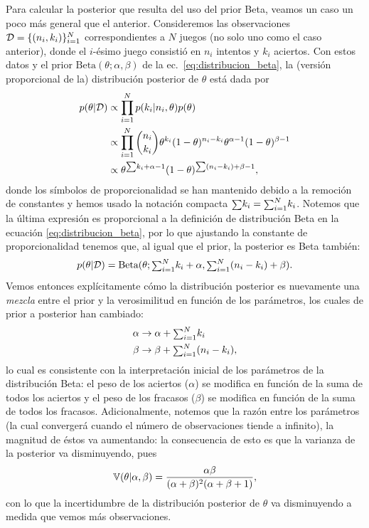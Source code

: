 Para calcular la posterior que resulta del uso del prior Beta, veamos un caso un poco más general que el anterior. Consideremos las observaciones ${\mathcal D} = \{(n_i,k_i)\}_{i=1}^N$ correspondientes a $N$ juegos (no solo uno como el caso anterior), donde el $i$-ésimo juego consistió en $n_i$ intentos y $k_i$ aciertos. Con estos datos y el prior $\text{Beta}(\theta;\alpha,\beta)$ de la ec.~\eqref{eq:distribucion_beta}, la (versión proporcional de la) distribución posterior de $\theta$ está dada por
\begin{align}
	p(\theta|{\mathcal D}) & 	\propto \prod_{i=1}^N  p(k_i|n_i,\theta)p(\theta)  \\
			 & \propto  \prod_{i=1}^N\binom{n_i}{k_i}\theta^{k_i}(1-\theta)^{n_i-k_i}\theta^{\alpha-1}(1-\theta)^{\beta-1} \nonumber\\
			 & \propto  \theta^{{\scriptstyle\sum} k_i + \alpha - 1}(1-\theta)^{{\scriptstyle\sum} (n_i-k_i) + \beta-1}, \nonumber
\end{align}
donde los símbolos de proporcionalidad se han mantenido debido a la remoción de constantes y hemos usado la notación compacta ${\scriptstyle\sum} k_i = {\scriptstyle\sum}_{i=1}^N k_i$. Notemos que la última expresión es proporcional a la definición de distribución Beta en la ecuación \eqref{eq:distribucion_beta}, por lo que ajustando la constante de proporcionalidad tenemos que, al igual que el prior, la posterior es Beta también: 
\begin{equation}
	p(\theta|{\mathcal D}) = \text{Beta}(\theta;{\scriptstyle\sum}_{i=1}^N k_i + \alpha,{\scriptstyle\sum}_{i=1}^N (n_i-k_i) + \beta).
\end{equation}
Vemos entonces explícitamente cómo la distribución posterior es nuevamente una \emph{mezcla} entre el prior y la verosimilitud en función de los parámetros, los cuales de prior a posterior han cambiado: 
\begin{align}
	\alpha &\to \alpha + {\scriptstyle\sum}_{i=1}^N k_i \label{eq:bayes_update_bin1}\\
	\beta  &\to \beta + {\scriptstyle\sum}_{i=1}^N (n_i-k_i) \label{eq:bayes_update_bin2},
\end{align}
lo cual es consistente con la interpretación inicial de los parámetros de la distribución Beta: el peso de los aciertos ($\alpha$) se modifica en función de la suma de todos los aciertos y el peso de los fracasos ($\beta$) se modifica en función de la suma de todos los fracasos. Adicionalmente, notemos que la razón entre los parámetros (la cual convergerá cuando el número de observaciones tiende a infinito), la magnitud de éstos va aumentando: la consecuencia de esto es que la varianza de la posterior va disminuyendo, pues 
\begin{equation}
	\operatorname{\mathbb{V}}(\theta|\alpha,\beta) = \frac{\alpha\beta}{(\alpha+\beta)^2(\alpha+\beta+1)},
\end{equation}
con lo que la incertidumbre de la distribución posterior de $\theta$ va disminuyendo a medida que vemos más observaciones. 



